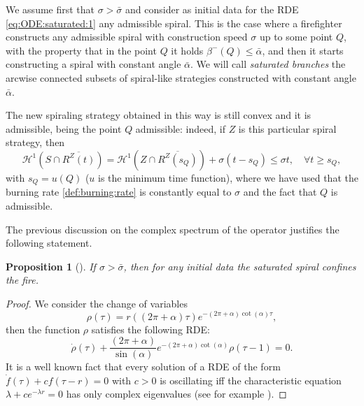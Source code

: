 \documentclass[reqno]{amsart}
\newcounter{assu}
\theoremstyle{definition} \newtheorem{definition}{Definition}[section]
\theoremstyle{definition} \newtheorem{remark}[definition]{Remark}
\theoremstyle{plain} \newtheorem{lemma}[definition]{Lemma}
\theoremstyle{plain} \newtheorem{proposition}[definition]{Proposition}
\theoremstyle{plain} \newtheorem{theorem}[definition]{Theorem}
\theoremstyle{plain} \newtheorem{corollary}[definition]{Corollary}
\theoremstyle{definition} \newtheorem{example}[definition]{Example}
\theoremstyle{plain} \newtheorem{claim}[clai]{Claim}
\theoremstyle{definition} \newtheorem{assumption}[definition]{Assumption}
\theoremstyle{definition} \newtheorem{observation}[definition]{Observation}
\newcommand{\1}{\mathbbm 1}
\renewcommand{\H}{\mathscr H}
\numberwithin{equation}{section} %
\theoremstyle{plain} \newtheorem*{theorem*}{Theorem}
\theoremstyle{plain} \newtheorem{mthm}[maintheorem]{Main Theorem}
\theoremstyle{plain} \newtheorem*{mthm*}{Main Theorem}
\theoremstyle{plain} \newtheorem*{conjecture*}{Conjecture}
\theoremstyle{plain} \newtheorem{conjecture}[definition]{Conjecture}
\theoremstyle{plain} \newtheorem*{problem*}{Problem}
\begin{document}
We assume first that $\sigma > \bar\sigma$ and consider as initial data for the RDE \eqref{eq:ODE:saturated:1} any admissible spiral. This is the case where a firefighter constructs any admissible spiral with construction speed $\sigma$ up to some point $Q$, with the property that in the point $Q$ it holds $\beta^-(Q) \leq \bar \alpha$, and then it starts constructing a spiral with constant angle $\bar \alpha$. We will call \emph{saturated branches} the arcwise connected subsets of spiral-like strategies constructed with constant angle $\bar \alpha$.

The new spiraling strategy obtained in this way is still convex and it is admissible, being the point $Q$ admissible: indeed, if $Z$ is this particular spiral strategy, then
\begin{equation*}
\H^1(S\cap\overline{R^Z(t)})= \H^1(Z\cap\overline{R^Z(s_Q)})+\sigma (t-s_Q)\leq \sigma t,\quad\forall t\geq s_Q,
\end{equation*}
with $s_Q=u(Q)$ ($u$ is the minimum time function), where we have used that the burning rate \eqref{def:burning:rate} is constantly equal to $\sigma$ and the fact that $Q$ is admissible.

The previous discussion on the complex spectrum of the operator justifies the following statement.

\begin{proposition}[\cite{Bressan_friends,firefighter}]
\label{prop:at:crit:speed:fire:dies}
If $\sigma>\bar\sigma$, then for any initial data the saturated spiral confines the fire.
\end{proposition}

\begin{proof}
We consider the change of variables
\begin{equation*}
\rho(\tau) = r((2\pi+\alpha) \tau) e^{-(2\pi + \alpha) \cot(\alpha) \tau},
\end{equation*}
then the function $\rho$ satisfies the following RDE:
\begin{equation*}
\dot \rho(\tau) + \frac{(2\pi + \alpha)}{\sin(\alpha)} e^{ -(2\pi+\alpha) \cot(\alpha)} \rho(\tau-1) = 0.
\end{equation*}
It is a well known fact that every solution of a RDE of the form $\dot f(\tau) + c f(\tau - r) = 0$ with $c > 0$ is oscillating iff the characteristic equation $\lambda + c e^{- \lambda r} = 0$ has only complex eigenvalues (see for example \cite{RDErussi}).
\end{proof}
\end{document}
